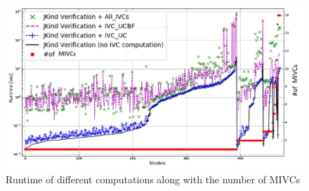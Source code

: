  \begin{figure}
 \centering
  \includegraphics[width=\columnwidth]{figs/size.jpg}
  \vspace{-0.2in}
  \caption{Runtime of different computations along with the number of MIVCs}
  \label{fig:modelsize}
  \vspace{-0.2in}
\end{figure}



